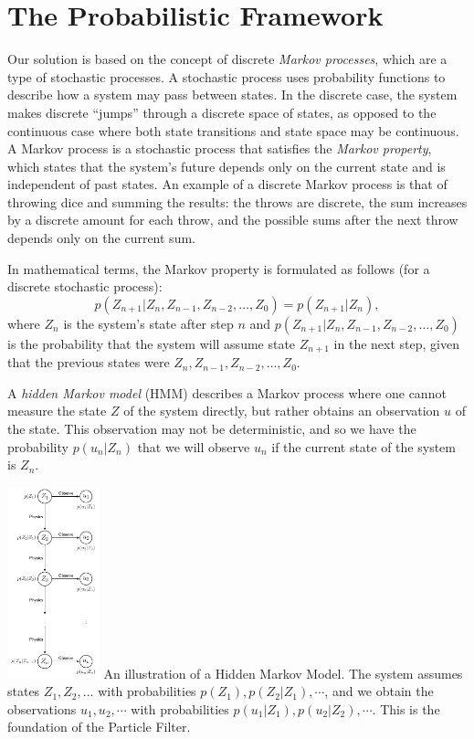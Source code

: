 \section*{The Probabilistic Framework}

Our solution is based on the concept of discrete \emph{Markov processes}, which are a type of stochastic processes. A stochastic process uses probability functions to describe how a system may pass between states. In the discrete case, the system makes discrete ``jumps'' through a discrete space of states, as opposed to the continuous case where both state transitions and state space may be continuous. A Markov process is a stochastic process that satisfies the \emph{Markov property}, which states that the system's future depends only on the current state and is independent of past states. An example of a discrete Markov process is that of throwing dice and summing the results: the throws are discrete, the sum increases by a discrete amount for each throw, and the possible sums after the next throw depends only on the current sum.

In mathematical terms, the Markov property is formulated as follows (for a discrete stochastic process):
\begin{equation}
  p\left(Z_{n+1}|Z_n, Z_{n-1}, Z_{n-2}, \dots, Z_0\right) = p\left(Z_{n+1}|Z_n\right),
\end{equation}
where $Z_n$ is the system's state after step $n$ and $p\left(Z_{n+1}|Z_n, Z_{n-1}, Z_{n-2}, \dots, Z_0\right)$ is the probability that the system will assume state $Z_{n+1}$ in the next step, given that the previous states were $Z_n, Z_{n-1}, Z_{n-2}, \dots, Z_0$.

A \emph{hidden Markov model} (HMM) describes a Markov process where one cannot measure the state $Z$ of the system directly, but rather obtains an observation $u$ of the state. This observation may not be deterministic, and so we have the probability $p(u_n|Z_n)$ that we will observe $u_n$ if the current state of the system is $Z_n$.

\includegraphics[width=0.2\textwidth]{figures/hmm-graph/hmm-graph.pdf}
An illustration of a Hidden Markov Model. The system assumes states $Z_1, Z_2, ...$ with probabilities $p(Z_1), p(Z_2|Z_1), \cdots$, and we obtain the observations $u_1, u_2, \cdots$ with probabilities $p(u_1|Z_1), p(u_2|Z_2), \cdots$. This is the foundation of the Particle Filter.

